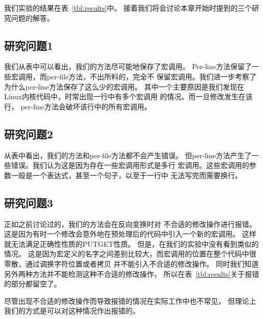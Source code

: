 
我们实验的结果在表~\ref{tbl:results}中。
接着我们将会讨论本章开始时提到的三个研究问题的解答。 

\subsection{研究问题1} 我们从表中可以看出，我们的方法尽可能地保存了宏调用。 
Per-line方法保留了一些宏调用，而per-file方法，不出所料的，完全不
保留宏调用。我们进一步考察了为什么per-line方法保存了这么少的宏调用。
其中一个主要原因是我们发现在Linux内核代码中，时常出现一行中有多个宏调用
的情况。而一旦修改发生在该行，
per-line方法会破坏该行中的所有宏调用。
\subsection{研究问题2} 从表中看出，我们的方法和per-file方法都不会产生错误。
但per-line方法产生了一些错误。我们认为这是因为存在一些宏调用形式是多行
宏调用。这些宏调用的参数一般是一个表达式，甚至一个句子，以至于一行中
无法写完而需要换行。
\subsection{研究问题3} 正如之前讨论过的，我们的方法会在反向变换时对
不合适的修改操作进行报错。这是因为有时一个修改会意外地在预处理后的代码中引入一个新的宏调用。
这样就无法满足正确性性质的PUTGET性质。
但是，在我们的实验中没有看到类似的情况。
这是因为宏定义的名字之间差别比较大，而宏调用的位置在整个代码中很零散，通过调换字符位置或者拷贝
并不能引入不合适的修改操作。
同时我们知道另外两种方法并不能检测这种不合适的修改操作，
所以在表~\ref{tbl:results}关于报错的部分都留空了。

尽管出现不合适的修改操作而导致报错的情况在实际工作中也不常见，
但理论上我们的方式是可以对这种情况作出报错的。

